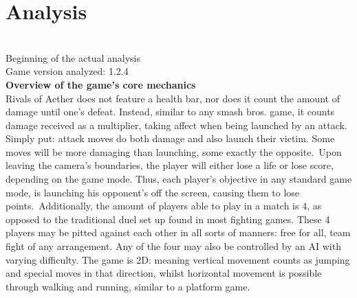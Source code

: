 \documentclass{article}
\begin{document}
\chapter{Analysis}\\
Beginning of the actual analysis\\
Game version analyzed: 1.2.4\\%
\textbf{Overview of the game's core mechanics}\\
Rivals of Aether does not feature a health bar, nor does it count the amount of damage until one's defeat. Instead, similar to any smash bros. game, it counts damage received as a multiplier, taking affect when being launched by an attack. Simply put: attack moves do both damage and also launch their victim. Some moves will be more damaging than launching, some exactly the opposite.\
Upon leaving the camera's boundaries, the player will either lose a life or lose score, depending on the game mode. Thus, each player's objective in any standard game mode, is launching his opponent's off the screen, causing them to lose points.\
 Additionally, the amount of players able to play in a match is 4, as opposed to the traditional duel set up found in most fighting games. These 4 players may be pitted against each other in all sorts of manners: free for all, team fight of any arrangement. Any of the four may also be controlled by an AI with varying difficulty. The game is 2D: meaning vertical movement counts as jumping and special moves in that direction, whilst horizontal movement is possible through walking and running, similar to a platform game.\\ %
\end{document}
